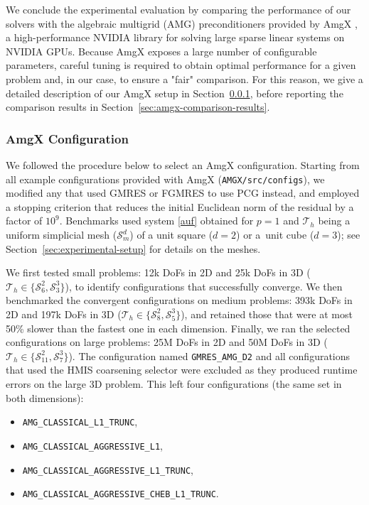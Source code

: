\documentclass[11pt]{article}
\theoremstyle{definition}
\theoremstyle{theorem}
\begin{document}
We conclude the experimental evaluation by comparing the performance
of our solvers with the algebraic multigrid (AMG) preconditioners
provided by AmgX \cite{amgx, amgx-reference}, a high-performance
NVIDIA library for solving large sparse linear systems on NVIDIA GPUs.
Because AmgX exposes a large number of configurable parameters,
careful tuning is required to obtain optimal performance for a given problem
and, in our case, to ensure a "fair" comparison. For this reason, we give
a detailed description of our AmgX setup
in Section~\ref{sec:amgx-configuration},
before reporting the comparison results in Section~\ref{sec:amgx-comparison-results}.

\subsubsection{AmgX Configuration}
\label{sec:amgx-configuration}

We followed the procedure below to select an AmgX configuration. Starting from all
example configurations provided with AmgX (\verb|AMGX/src/configs|), we modified any that used
GMRES or FGMRES to use PCG instead, and employed a stopping criterion that reduces
the initial Euclidean norm of the residual by a factor of $10^9$. Benchmarks
used system \eqref{auf} obtained for $p=1$ and $\mathcal{T}_h$ being a uniform
simplicial mesh ($\mathcal{S}_m^d$) of a unit square ($d=2$) or a~unit cube ($d=3$);
see Section~\ref{sec:experimental-setup} for details on the meshes.

We first tested small problems: 12k DoFs in 2D and 25k DoFs in 3D
($\mathcal{T}_h\in \{\mathcal{S}_6^2, \mathcal{S}_3^3\}$), to identify
configurations that successfully converge. We then benchmarked the convergent configurations
on medium problems: 393k DoFs in 2D and 197k DoFs in 3D
($\mathcal{T}_h\in \{\mathcal{S}_8^2, \mathcal{S}_5^3\}$), and retained those
that were at most 50\% slower than the fastest one in each dimension.
Finally, we ran the selected configurations on large problems:
25M DoFs in 2D and 50M DoFs in 3D ($\mathcal{T}_h\in \{\mathcal{S}_{11}^2, \mathcal{S}_7^3\}$).
The configuration named \verb|GMRES_AMG_D2| and all configurations that
used the HMIS coarsening selector were excluded as they produced runtime errors
on the large 3D problem. This left four configurations (the same set in both dimensions):
\begin{itemize}
  \item \verb|AMG_CLASSICAL_L1_TRUNC|,
  \item \verb|AMG_CLASSICAL_AGGRESSIVE_L1|,
  \item \verb|AMG_CLASSICAL_AGGRESSIVE_L1_TRUNC|,
  \item \verb|AMG_CLASSICAL_AGGRESSIVE_CHEB_L1_TRUNC|.
\end{itemize}
\end{document}
